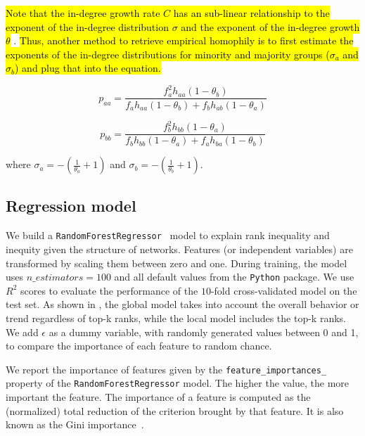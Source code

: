 \documentclass[fleqn,10pt]{wlscirep}
\begin{document}
\hl{Note that the in-degree growth rate $C$ has an sub-linear relationship to the exponent of the in-degree distribution $\sigma$  and the exponent of the in-degree growth $\theta$} \cite{karimi2018homophily}. \hl{Thus, another method to retrieve empirical homophily is to first estimate the exponents of the in-degree distributions for minority and majority groups ($\sigma_a$ and $\sigma_b$) and plug that into the equation. }

\begin{equation}
p_{aa} = \frac{f_a^2 h_{aa}(1-\theta_b)}{f_a h_{aa}(1-\theta_b) + f_b h_{ab}(1-\theta_a)}
\end{equation}

\begin{equation}
p_{bb} = \frac{f_b^2 h_{bb}(1-\theta_a)}{f_b h_{bb}(1-\theta_a) + f_a h_{ba}(1-\theta_b)}
\end{equation}

where $\sigma_a = -(\frac{1}{\theta_a} + 1)$ and $\sigma_b = -(\frac{1}{\theta_b} + 1)$. 


\subsection{Regression model}
\label{sm:models}
We build a \texttt{RandomForestRegressor}~\cite{scikit-learn,randomforest} model to explain rank inequality and inequity given the structure of networks. Features (or independent variables) are transformed by scaling them between zero and one. During training, the model uses $n\_estimators=100$ and all default values from the \texttt{Python} package. We use $R^2$ scores to evaluate the performance of the $10$-fold cross-validated model on the test set.
As shown in , the global model takes into account the overall behavior or trend regardless of top-k ranks, while the local model includes the top-k ranks. We add $\epsilon$ as a dummy variable, with randomly generated values between 0 and 1, to compare the importance of each feature to random chance.

We report the importance of features given by the \texttt{feature\_importances\_} property of the \texttt{RandomForestRegressor} model. The higher the value, the more important the feature. The importance of a feature is computed as the (normalized) total reduction of the criterion brought by that feature. It is also known as the Gini importance~\cite{randomforest}.


    
\end{document}
